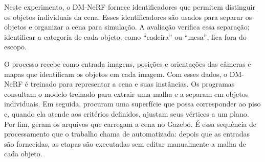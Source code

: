 Neste experimento, o DM-NeRF fornece identificadores que permitem distinguir os objetos individuais da cena. Esses identificadores são usados para separar os objetos e organizar a cena para simulação. A avaliação verifica essa separação; identificar a categoria de cada objeto, como ``cadeira'' ou ``mesa'', fica fora do escopo.

O processo recebe como entrada imagens, posições e orientações das câmeras e mapas que identificam os objetos em cada imagem. Com esses dados, o DM-NeRF é treinado para representar a cena e suas instâncias. Os programas consultam o modelo treinado para extrair uma malha e a separam em objetos individuais. Em seguida, procuram uma superfície que possa corresponder ao piso e, quando ela atende aos critérios definidos, ajustam seus vértices a um plano. Por fim, geram os arquivos que carregam a cena no Gazebo. É essa sequência de processamento que o trabalho chama de automatizada: depois que as entradas são fornecidas, as etapas são executadas sem editar manualmente a malha de cada objeto.

